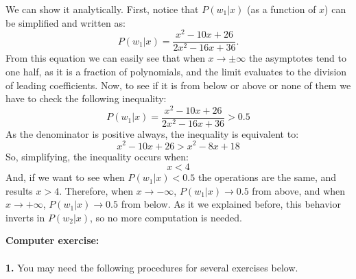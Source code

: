 \documentclass[10pt]{article}
\begin{document}
\begin{enumerate}
We can show it analytically. First, notice that $P(w_1|x)$ (as a function of $x$) can be simplified and written as:
$$
P(w_1|x) = \frac{x^2 - 10x + 26}{2x^2-16x+36}.
$$
From this equation we can easily see that when $x \rightarrow \pm\infty$ the asymptotes tend to one half, as it is a fraction of polynomials, and the limit evaluates to the division of leading coefficients. Now, to see if it is from below or above or none of them we have to check the following inequality:
$$
P(w_1|x) =\frac{x^2 - 10x + 26}{2x^2-16x+36}>0.5
$$
As the denominator is positive always, the inequality is equivalent to:
$$
x^2 - 10x + 26 > x^2-8x+18
$$
So, simplifying, the inequality occurs when:
$$
x < 4
$$
And, if we want to see when $P(w_1|x) < 0.5$ the operations are the same, and results $ x > 4$. Therefore, when $x \rightarrow -\infty$,
$P(w_1|x)\rightarrow 0.5$ from above, and when $x \rightarrow +\infty$, $P(w_1|x) \rightarrow 0.5$ from below. As it we explained before, this behavior inverts in $P(w_2|x)$, so no more computation is needed. \\
\end{enumerate}
\newpage
\Huge{\textbf{Computer exercise:}} \\ \ \\
\Large
\textbf{1.}  You may need the following procedures for several exercises below.
\end{document}
